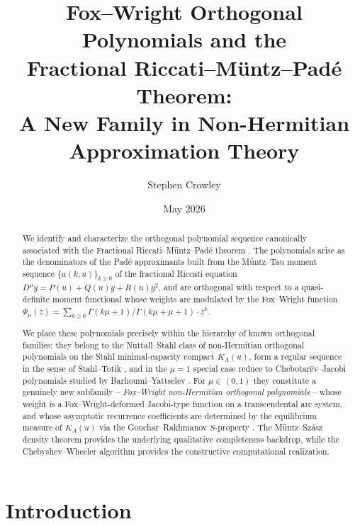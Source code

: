 \documentclass{article}
\begin{document}
\title{%
  Fox--Wright Orthogonal Polynomials and the\\
  Fractional Riccati--M\"{u}ntz--Pad\'{e} Theorem:\\
  A New Family in Non-Hermitian Approximation Theory
}
\author{Stephen Crowley}
\date{May 2026}
\maketitle

\begin{abstract}
We identify and characterize the orthogonal polynomial sequence canonically
associated with the Fractional Riccati--M\"{u}ntz--Pad\'{e} theorem
\cite{Crowley2026}. The polynomials arise as the denominators of the
Pad\'{e} approximants built from the Müntz--Tau moment sequence
$\{a(k,u)\}_{k \ge 0}$ of the fractional Riccati equation
$D^{\mu}y = P(u) + Q(u)y + R(u)y^{2}$, and are orthogonal with respect to a
quasi-definite moment functional whose weights are modulated by the
Fox--Wright function $\Psi_\mu(z) = \sum_{k \ge 0}
\Gamma(k\mu{+}1)/\Gamma(k\mu{+}\mu{+}1)\cdot z^k$.

We place these polynomials precisely within the hierarchy of known orthogonal
families: they belong to the Nuttall--Stahl class of non-Hermitian orthogonal
polynomials \cite{NuttallSingh1977,Stahl1985I,Stahl1985II} on the Stahl
minimal-capacity compact $K_A(u)$, form a regular sequence in the sense of
Stahl--Totik \cite{StahlTotik1992}, and in the $\mu=1$ special case reduce
to Chebotarëv--Jacobi polynomials studied by
Barhoumi--Yattselev \cite{BarhoumiYattselev2023}. For $\mu \in (0,1)$ they
constitute a genuinely new subfamily -- \emph{Fox--Wright non-Hermitian
orthogonal polynomials} -- whose weight is a Fox--Wright-deformed
Jacobi-type function on a transcendental arc system, and whose asymptotic
recurrence coefficients are determined by the equilibrium measure of $K_A(u)$
via the Gonchar--Rakhmanov $S$-property \cite{GoncharRakhmanov1987}.
The Müntz--Szász density theorem \cite{MuntzSzasz1914,Moragues2018} provides
the underlying qualitative completeness backdrop, while the
Chebyshev--Wheeler algorithm \cite{Wheeler1974,Gragg1972} provides the
constructive computational realization.
\end{abstract}

\tableofcontents

\section{Introduction}
\end{document}
